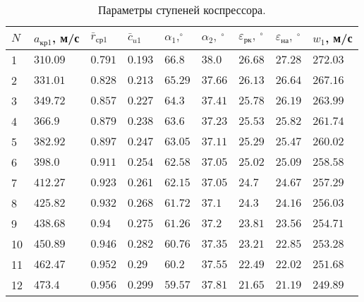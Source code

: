\documentclass[a4paper,10pt]{article}
\begin{document}
     \begin{longtable}{|p{0.7cm}|p{1.1cm}|p{1.1cm}|p{1.1cm}|p{1.1cm}|p{1.1cm}|p{1.1cm}|p{1.1cm}|p{1.1cm}|}
        \caption{Параметры ступеней коспрессора.}\\ \hline
        $N$ & $a_{кр1}$, м/с & $\bar{r}_{ср1}$ & $\bar{c}_{u1}$ & $\alpha_1, ^\circ$ & $\alpha_2,\ ^\circ$ &
        $\varepsilon_{рк},\ ^\circ$ & $\varepsilon_{на},\ ^\circ$ & $w_1$, м/с  \\ \hline
%        
        1 & $310.09$ & $0.791$ &
        $0.193$ & $66.8$ & $38.0$ &
        $26.68$ & $27.28$ &
        $272.03$ \\ \hline
%        
        2 & $331.01$ & $0.828$ &
        $0.213$ & $65.29$ & $37.66$ &
        $26.13$ & $26.64$ &
        $267.16$ \\ \hline
%        
        3 & $349.72$ & $0.857$ &
        $0.227$ & $64.3$ & $37.41$ &
        $25.78$ & $26.19$ &
        $263.99$ \\ \hline
%        
        4 & $366.9$ & $0.879$ &
        $0.238$ & $63.6$ & $37.23$ &
        $25.53$ & $25.82$ &
        $261.74$ \\ \hline
%        
        5 & $382.92$ & $0.897$ &
        $0.247$ & $63.05$ & $37.11$ &
        $25.29$ & $25.47$ &
        $260.02$ \\ \hline
%        
        6 & $398.0$ & $0.911$ &
        $0.254$ & $62.58$ & $37.05$ &
        $25.02$ & $25.09$ &
        $258.58$ \\ \hline
%        
        7 & $412.27$ & $0.923$ &
        $0.261$ & $62.15$ & $37.05$ &
        $24.7$ & $24.67$ &
        $257.29$ \\ \hline
%        
        8 & $425.82$ & $0.932$ &
        $0.268$ & $61.72$ & $37.1$ &
        $24.3$ & $24.16$ &
        $256.03$ \\ \hline
%        
        9 & $438.68$ & $0.94$ &
        $0.275$ & $61.26$ & $37.2$ &
        $23.81$ & $23.56$ &
        $254.71$ \\ \hline
%        
        10 & $450.89$ & $0.946$ &
        $0.282$ & $60.76$ & $37.35$ &
        $23.21$ & $22.85$ &
        $253.28$ \\ \hline
%        
        11 & $462.47$ & $0.952$ &
        $0.29$ & $60.2$ & $37.55$ &
        $22.49$ & $22.02$ &
        $251.68$ \\ \hline
%        
        12 & $473.4$ & $0.956$ &
        $0.299$ & $59.57$ & $37.81$ &
        $21.65$ & $21.19$ &
        $249.89$ \\ \hline
%        
    \end{longtable}
\end{document}
